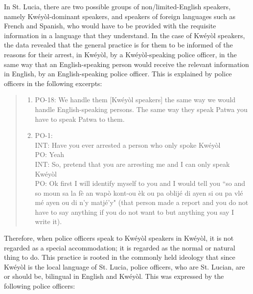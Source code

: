 \documentclass[output=paper,colorlinks,citecolor=brown]{langscibook}
\begin{document}
In St. Lucia, there are two possible groups of non/limited-English speakers, namely Kwéyòl-dominant speakers, and speakers of foreign languages such as French and Spanish, who would have to be provided with the requisite information in a language that they understand. In the case of Kwéyòl speakers, the data revealed that the general practice is for them to be informed of the reasons for their arrest, in Kwéyòl, by a Kwéyòl-speaking police officer, in the same way that an English-speaking person would receive the relevant information in English, by an English-speaking police officer. This is explained by police officers in the following excerpts:

\begin{quote}
  \begin{enumerate}
    \item PO-18: We handle them [Kwéyòl speakers] the same way we would handle English-speaking persons. The same way they speak Patwa you have to speak Patwa to them.

    \item PO-1: \\
    INT: Have you ever arrested a person who only spoke Kwéyòl \\
    PO: Yeah \\
    INT: So, pretend that you are arresting me and I can only speak Kwéyòl \\
    PO: Ok first I will identify myself to you and I would tell you “so and so moun sa la fè an wapò kont-ou èk ou pa oblijé di ayen si ou pa vlé mé ayen ou di n’y matjé’y" (that person made a report and you do not have to say anything if you do not want to but anything you say I write it).
  \end{enumerate}
\end{quote}

Therefore, when police officers speak to Kwéyòl speakers in Kwéyòl, it is not regarded as a special accommodation; it is regarded as the normal or natural thing to do. This practice is rooted in the commonly held ideology that since Kwéyòl is the local language of St. Lucia, police officers, who are St. Lucian, are or should be, bilingual in English and Kwéyòl. This was expressed by the following police officers:
\end{document}
